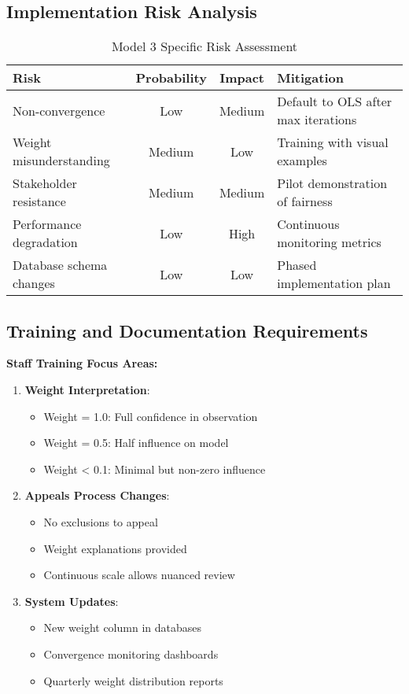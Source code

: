 \subsection{Implementation Risk Analysis}

\begin{table}[ht]
\centering
\caption{Model 3 Specific Risk Assessment}
\begin{tabular}{p{3.5cm}ccp{4.5cm}}
\toprule
\textbf{Risk} & \textbf{Probability} & \textbf{Impact} & \textbf{Mitigation} \\
\midrule
Non-convergence & Low & Medium & Default to OLS after max iterations \\
Weight misunderstanding & Medium & Low & Training with visual examples \\
Stakeholder resistance & Medium & Medium & Pilot demonstration of fairness \\
Performance degradation & Low & High & Continuous monitoring metrics \\
Database schema changes & Low & Low & Phased implementation plan \\
\bottomrule
\end{tabular}
\end{table}

\subsection{Training and Documentation Requirements}

\textbf{Staff Training Focus Areas:}
\begin{enumerate}
    \item \textbf{Weight Interpretation}:
    \begin{itemize}
        \item Weight = 1.0: Full confidence in observation
        \item Weight = 0.5: Half influence on model
        \item Weight < 0.1: Minimal but non-zero influence
    \end{itemize}
    \item \textbf{Appeals Process Changes}:
    \begin{itemize}
        \item No exclusions to appeal
        \item Weight explanations provided
        \item Continuous scale allows nuanced review
    \end{itemize}
    \item \textbf{System Updates}:
    \begin{itemize}
        \item New weight column in databases
        \item Convergence monitoring dashboards
        \item Quarterly weight distribution reports
    \end{itemize}
\end{enumerate}

